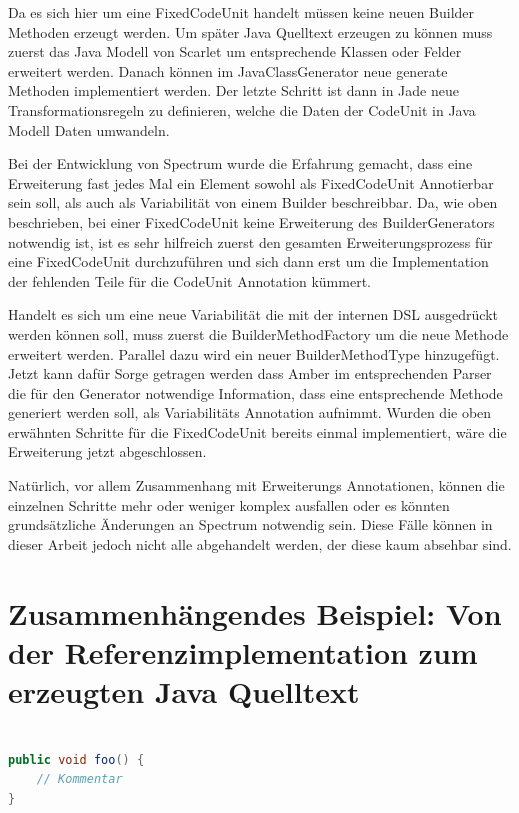 \documentclass[12pt,oneside,a4paper,parskip]{scrbook}
\begin{document}
Da es sich hier um eine FixedCodeUnit handelt müssen keine neuen Builder Methoden erzeugt werden. Um später Java Quelltext erzeugen zu können muss zuerst das Java Modell von Scarlet um entsprechende Klassen oder Felder erweitert werden. Danach können im JavaClassGenerator neue generate Methoden implementiert werden. Der letzte Schritt ist dann in Jade neue Transformationsregeln zu definieren, welche die Daten der CodeUnit in Java Modell Daten umwandeln.

Bei der Entwicklung von Spectrum wurde die Erfahrung gemacht, dass eine Erweiterung fast jedes Mal ein Element sowohl als FixedCodeUnit Annotierbar sein soll, als auch als Variabilität von einem Builder beschreibbar. Da, wie oben beschrieben, bei einer FixedCodeUnit keine Erweiterung des BuilderGenerators notwendig ist, ist es sehr hilfreich zuerst den gesamten Erweiterungsprozess für eine FixedCodeUnit durchzuführen und sich dann erst um die Implementation der fehlenden Teile für die CodeUnit Annotation kümmert.

Handelt es sich um eine neue Variabilität die mit der internen DSL ausgedrückt werden können soll, muss zuerst die BuilderMethodFactory um die neue Methode erweitert werden. Parallel dazu wird ein neuer BuilderMethodType hinzugefügt. Jetzt kann dafür Sorge getragen werden dass Amber im entsprechenden Parser die für den Generator notwendige Information, dass eine entsprechende Methode generiert werden soll, als Variabilitäts Annotation aufnimmt. Wurden die oben erwähnten Schritte für die FixedCodeUnit bereits einmal implementiert, wäre die Erweiterung jetzt abgeschlossen.

Natürlich, vor allem Zusammenhang mit Erweiterungs Annotationen, können die einzelnen Schritte mehr oder weniger komplex ausfallen oder es könnten grundsätzliche Änderungen an Spectrum notwendig sein. Diese Fälle können in dieser Arbeit jedoch nicht alle abgehandelt werden, der diese kaum absehbar sind.

\section{Zusammenhängendes Beispiel: Von der Referenzimplementation zum erzeugten Java Quelltext}

\begin{lstlisting}[label=lst:java,
				   language=java,
				   firstnumber=1,
				   caption=Beispiel für einen Quelltext]

public void foo() {
	// Kommentar
}
\end{lstlisting}
\end{document}
